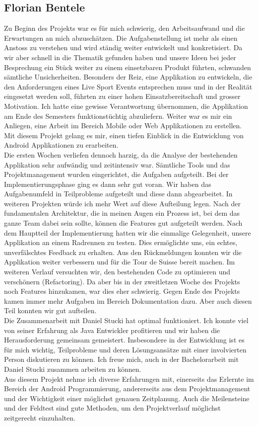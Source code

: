 \subsection{Florian Bentele}
Zu Beginn des Projekts war es für mich schwierig, den Arbeitsaufwand und die Erwartungen an mich abzuschätzen. Die Aufgabenstellung ist mehr als einen Anstoss zu verstehen und wird ständig weiter entwickelt und konkretisiert. Da wir aber schnell in die Thematik gefunden haben und unsere Ideen bei jeder Besprechung ein Stück weiter zu einem einsetzbaren Produkt führten, schwanden sämtliche Unsicherheiten. Besonders der Reiz, eine Applikation zu entwickeln, die den Anforderungen eines Live Sport Events entsprechen muss und in der Realität eingesetzt werden soll, führten zu einer hohen Einsatzbereitschaft und grosser Motivation. Ich hatte eine gewisse Verantwortung übernommen, die Applikation am Ende des Semesters funktionstüchtig abzuliefern. Weiter war es mir ein Anliegen, eine Arbeit im Bereich Mobile oder Web Applikationen zu erstellen. Mit diesem Projekt gelang es mir, einen tiefen Einblick in die Entwicklung von Android Applikationen zu erarbeiten.
\\
Die ersten Wochen verliefen dennoch harzig, da die Analyse der bestehenden Applikation sehr aufwändig und zeitintensiv war. Sämtliche Tools und das Projektmanagement wurden eingerichtet, die Aufgaben aufgeteilt. Bei der Implementierungsphase ging es dann sehr gut voran. Wir haben das Aufgabenumfeld in Teilprobleme aufgeteilt und diese dann abgearbeitet. In weiteren Projekten würde ich mehr Wert auf diese Aufteilung legen. Nach der fundamentalen Architektur, die in meinen Augen ein Prozess ist, bei dem das ganze Team dabei sein sollte, können die Features gut aufgeteilt werden. Nach dem Hauptteil der Implementierung hatten wir die einmalige Gelegenheit, unsere Applikation an einem Radrennen zu testen. Dies ermöglichte uns, ein echtes, unverfälschtes Feedback zu erhalten. Aus den Rückmeldungen konnten wir die Applikation weiter verbessern und für die Tour de Suisse bereit machen.  Im weiteren Verlauf versuchten wir, den bestehenden Code zu optimieren und verschönern (Refactoring). Da aber bis in der zweitletzen Woche des Projekts noch Features hinzukamen, war dies eher schwierig. Gegen Ende des Projekts kamen immer mehr Aufgaben im Bereich Dokumentation dazu. Aber auch diesen Teil konnten wir gut aufteilen.
\\
Die Zusammenarbeit mit Daniel Stucki hat optimal funktioniert. Ich konnte viel von seiner Erfahrung als Java Entwickler profitieren und wir haben die Herausforderung gemeinsam gemeistert. Insbesondere in der Entwicklung ist es für mich wichtig, Teilprobleme und deren Lösungsansätze mit einer involvierten Person diskutieren zu können. Ich freue mich, auch in der Bachelorarbeit mit Daniel Stucki zusammen arbeiten zu können.
\\
Aus diesem Projekt nehme ich diverse Erfahrungen mit, einerseits das Erlernte im Bereich der Android Programmierung, andererseits aus dem Projektmanagement und der Wichtigkeit einer möglichst genauen Zeitplanung. Auch die Meilensteine und der Feldtest sind gute Methoden, um den Projektverlauf möglichst zeitgerecht einzuhalten.

